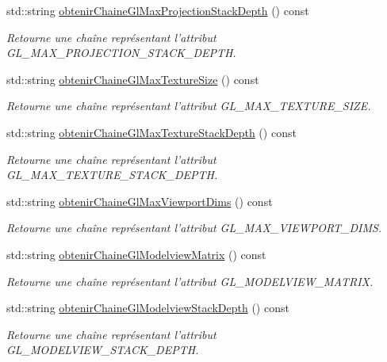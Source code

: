 \begin{DoxyCompactItemize}
std\-::string \hyperlink{group__utilitaire_ga8c2d3530aa09867d9c01d8433839011e}{obtenir\-Chaine\-Gl\-Max\-Projection\-Stack\-Depth} () const 
\begin{DoxyCompactList}\small\item\em Retourne une chaîne représentant l'attribut G\-L\-\_\-\-M\-A\-X\-\_\-\-P\-R\-O\-J\-E\-C\-T\-I\-O\-N\-\_\-\-S\-T\-A\-C\-K\-\_\-\-D\-E\-P\-T\-H. \end{DoxyCompactList}\item 
std\-::string \hyperlink{group__utilitaire_gaeba7eaad6682c2c4aa8925501601c606}{obtenir\-Chaine\-Gl\-Max\-Texture\-Size} () const 
\begin{DoxyCompactList}\small\item\em Retourne une chaîne représentant l'attribut G\-L\-\_\-\-M\-A\-X\-\_\-\-T\-E\-X\-T\-U\-R\-E\-\_\-\-S\-I\-Z\-E. \end{DoxyCompactList}\item 
std\-::string \hyperlink{group__utilitaire_ga9aac1a0891487831a30125fca75bec93}{obtenir\-Chaine\-Gl\-Max\-Texture\-Stack\-Depth} () const 
\begin{DoxyCompactList}\small\item\em Retourne une chaîne représentant l'attribut G\-L\-\_\-\-M\-A\-X\-\_\-\-T\-E\-X\-T\-U\-R\-E\-\_\-\-S\-T\-A\-C\-K\-\_\-\-D\-E\-P\-T\-H. \end{DoxyCompactList}\item 
std\-::string \hyperlink{group__utilitaire_ga0dad12ef08cd32b9fb94e214f00a95a9}{obtenir\-Chaine\-Gl\-Max\-Viewport\-Dims} () const 
\begin{DoxyCompactList}\small\item\em Retourne une chaîne représentant l'attribut G\-L\-\_\-\-M\-A\-X\-\_\-\-V\-I\-E\-W\-P\-O\-R\-T\-\_\-\-D\-I\-M\-S. \end{DoxyCompactList}\item 
std\-::string \hyperlink{group__utilitaire_ga44c62c93a914527f821b2aef913fada7}{obtenir\-Chaine\-Gl\-Modelview\-Matrix} () const 
\begin{DoxyCompactList}\small\item\em Retourne une chaîne représentant l'attribut G\-L\-\_\-\-M\-O\-D\-E\-L\-V\-I\-E\-W\-\_\-\-M\-A\-T\-R\-I\-X. \end{DoxyCompactList}\item 
std\-::string \hyperlink{group__utilitaire_ga745672a8704edbf33daef5314f9cdfaf}{obtenir\-Chaine\-Gl\-Modelview\-Stack\-Depth} () const 
\begin{DoxyCompactList}\small\item\em Retourne une chaîne représentant l'attribut G\-L\-\_\-\-M\-O\-D\-E\-L\-V\-I\-E\-W\-\_\-\-S\-T\-A\-C\-K\-\_\-\-D\-E\-P\-T\-H. \end{DoxyCompactList}\item 

\end{DoxyCompactItemize}

